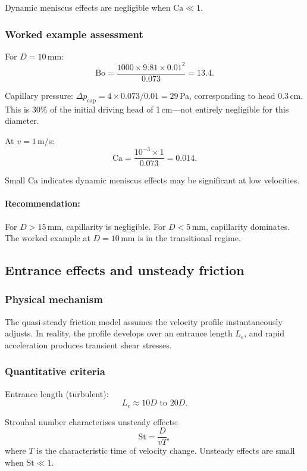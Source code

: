 \documentclass[11pt]{article}
\begin{document}
Dynamic meniscus effects are negligible when $\text{Ca} \ll 1$.

\subsubsection{Worked example assessment}

For $D = 10$\,mm:
\[
  \text{Bo} = \frac{1000 \times 9.81 \times 0.01^2}{0.073} = 13.4.
\]

Capillary pressure: $\Delta p_{\text{cap}} = 4 \times 0.073/0.01 = 29$\,Pa, corresponding to head $0.3$\,cm. This is 30\% of the initial driving head of 1\,cm---not entirely negligible for this diameter.

At $v = 1$\,m/s:
\[
  \text{Ca} = \frac{10^{-3} \times 1}{0.073} = 0.014.
\]

Small $\text{Ca}$ indicates dynamic meniscus effects may be significant at low velocities.

\paragraph{Recommendation:} For $D > 15$\,mm, capillarity is negligible. For $D < 5$\,mm, capillarity dominates. The worked example at $D = 10$\,mm is in the transitional regime.

\subsection{Entrance effects and unsteady friction}

\subsubsection{Physical mechanism}

The quasi-steady friction model assumes the velocity profile instantaneously adjusts. In reality, the profile develops over an entrance length $L_e$, and rapid acceleration produces transient shear stresses.

\subsubsection{Quantitative criteria}

Entrance length (turbulent):
\begin{equation}
  L_e \approx 10D \text{ to } 20D.
  \label{eq:entrance}
\end{equation}

Strouhal number characterises unsteady effects:
\begin{equation}
  \text{St} = \frac{D}{vT},
  \label{eq:strouhal}
\end{equation}
where $T$ is the characteristic time of velocity change. Unsteady effects are small when $\text{St} \ll 1$.
\end{document}

